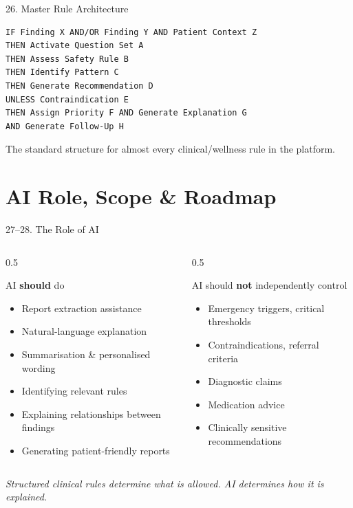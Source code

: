 \documentclass[10pt,aspectratio=169]{beamer}
\begin{document}
\begin{frame}[fragile]{26. Master Rule Architecture}
\scriptsize
\begin{verbatim}
IF Finding X AND/OR Finding Y AND Patient Context Z
THEN Activate Question Set A
THEN Assess Safety Rule B
THEN Identify Pattern C
THEN Generate Recommendation D
UNLESS Contraindication E
THEN Assign Priority F AND Generate Explanation G
AND Generate Follow-Up H
\end{verbatim}
\normalsize
The standard structure for almost every clinical/wellness rule in the platform.
\end{frame}

\section{AI Role, Scope \& Roadmap}

\begin{frame}{27--28. The Role of AI}
\begin{columns}[T]
\begin{column}{0.5\textwidth}
\begin{block}{AI \textbf{should} do}
\scriptsize
\begin{itemize}
\item Report extraction assistance
\item Natural-language explanation
\item Summarisation \& personalised wording
\item Identifying relevant rules
\item Explaining relationships between findings
\item Generating patient-friendly reports
\end{itemize}
\end{block}
\end{column}
\begin{column}{0.5\textwidth}
\begin{alertblock}{AI should \textbf{not} independently control}
\scriptsize
\begin{itemize}
\item Emergency triggers, critical thresholds
\item Contraindications, referral criteria
\item Diagnostic claims
\item Medication advice
\item Clinically sensitive recommendations
\end{itemize}
\end{alertblock}
\end{column}
\end{columns}
\vfill
\centering \footnotesize \textit{Structured clinical rules determine what is allowed. AI determines how it is explained.}
\end{frame}
\end{document}
